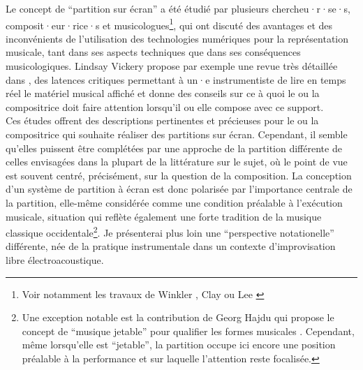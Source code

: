 \indent Le concept de ``partition sur écran'' a été étudié par plusieurs chercheu·r·se·s, composit·eur·rice·s et musicologues\footnote{Voir notamment les travaux de Winkler \cite{winkler_real-time_2004}, Clay \cite{adams_inventing_2008} ou Lee \cite{lee_real-time_2012}}, qui ont discuté des avantages et des inconvénients de l'utilisation des technologies numériques pour la représentation musicale, tant dans ses aspects techniques que dans ses conséquences musicologiques. Lindsay Vickery propose par exemple une revue très détaillée dans \cite{vickery_limitations_2014}, des latences critiques permettant à un·e instrumentiste de lire en temps réel le matériel musical affiché et donne des conseils sur ce à quoi le ou la compositrice doit faire attention lorsqu'il ou elle compose avec ce support.\\
\indent Ces études offrent des descriptions pertinentes et précieuses pour le ou la compositrice qui souhaite réaliser des partitions sur écran. Cependant, il semble qu'elles puissent être complétées par une approche de la partition différente de celles envisagées dans la plupart de la littérature sur le sujet, où le point de vue est souvent centré, précisément, sur la question de la composition. La conception d'un système de partition à écran est donc polarisée par l'importance centrale de la partition, elle-même considérée comme une condition préalable à l'exécution musicale, situation qui reflète également une forte tradition de la musique classique occidentale\footnote{Une exception notable est la contribution de Georg Hajdu \cite{hajdu_disposable_2016} qui propose le concept de ``musique jetable'' pour qualifier les formes musicales . Cependant, même lorsqu'elle est ``jetable'', la partition occupe ici encore une position préalable à la performance et sur laquelle l'attention reste focalisée.}. Je présenterai plus loin une ``perspective notationelle'' différente, née de la pratique instrumentale dans un contexte d'improvisation libre électroacoustique.


